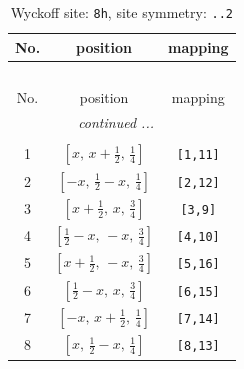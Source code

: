 \documentclass[fleqn,8pt]{jsarticle}
\begin{document}
\begin{longtable}{ccc}
\caption{Wyckoff site: {\tt 8h}, site symmetry: {\tt ..2}}
 \\
 \hline \hline
No. & position & mapping \\ \hline \endfirsthead

\multicolumn{2}{l}{\tablename\ \thetable{}} \\
 \hline \hline
No. & position & mapping \\ \hline \endhead

 \hline \hline
\multicolumn{2}{r}{\footnotesize\it continued ...} \\ \endfoot

 \hline \hline
\multicolumn{2}{r}{} \\ \endlastfoot

1 & $\left[ x,\, x + \frac{1}{2},\, \frac{1}{4} \right]$ & {\tt [1,11]} \\ \hline
2 & $\left[ - x,\, \frac{1}{2} - x,\, \frac{1}{4} \right]$ & {\tt [2,12]} \\ \hline
3 & $\left[ x + \frac{1}{2},\, x,\, \frac{3}{4} \right]$ & {\tt [3,9]} \\ \hline
4 & $\left[ \frac{1}{2} - x,\, - x,\, \frac{3}{4} \right]$ & {\tt [4,10]} \\ \hline
5 & $\left[ x + \frac{1}{2},\, - x,\, \frac{3}{4} \right]$ & {\tt [5,16]} \\ \hline
6 & $\left[ \frac{1}{2} - x,\, x,\, \frac{3}{4} \right]$ & {\tt [6,15]} \\ \hline
7 & $\left[ - x,\, x + \frac{1}{2},\, \frac{1}{4} \right]$ & {\tt [7,14]} \\ \hline
8 & $\left[ x,\, \frac{1}{2} - x,\, \frac{1}{4} \right]$ & {\tt [8,13]} \\
\end{longtable}
\renewcommand{\arraystretch}{1.2}
\end{document}
